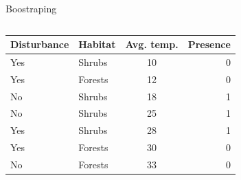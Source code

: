 \documentclass{irdbeamer}
\begin{document}
\begin{frame}{Boostraping}
\begin{columns}
    \begin{column}{0.5\textwidth}
\centering
{\footnotesize
\begin{tabular}{llc|r}
    \toprule
    Disturbance & Habitat & Avg. temp. & Presence \\
    \midrule
    Yes & Shrubs    & 10 & 0 \\
    Yes & Forests   & 12 & 0 \\
    No  & Shrubs    & 18 & 1 \\
    No  & Shrubs    & 25 & 1 \\
    Yes & Shrubs    & 28 & 1 \\
    Yes & Forests   & 30 & 0 \\
    No  & Forests   & 33 & 0 \\
    \bottomrule
\end{tabular}
        }
    \end{column}
    \begin{column}{0.5\textwidth}
\centering
\end{column}
\end{columns}
\end{frame}
\end{document}
